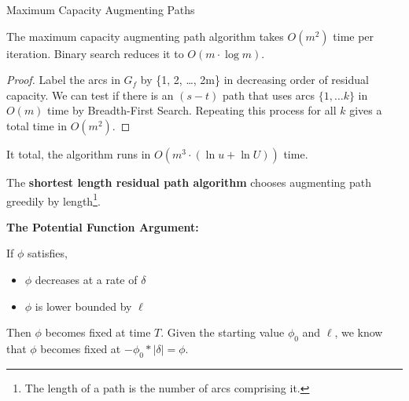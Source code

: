 	\begin{algorithm}
	  \caption{Maximum Capacity Augmenting Paths}\label{greedyaug}
	\end{algorithm}

	\begin{thm}
		The maximum capacity augmenting path algorithm takes $O(m^2)$ time per iteration. Binary search reduces it to $O(m \cdot \log m)$.
	\end{thm}

	\begin{proof}
		Label the arcs in $G_f$ by \{1, 2, \dots, 2m\} in decreasing order of residual capacity. We can test if there is an $(s-t)$ path that uses arcs $\{1, \dots k\}$ in $O(m)$ time by Breadth-First Search. Repeating this process for all $k$ gives a total time in $O(m^2)$.
	\end{proof}

	\begin{cor}
		It total, the algorithm runs in $O(m^3 \cdot (\ln u + \ln U))$ time.
	\end{cor}

	\begin{defn}
		The \textbf{shortest length residual path algorithm} chooses augmenting path greedily by length\footnote{The length of a path is the number of arcs comprising it.}.
	\end{defn}

	\begin{marginfigure}
		\textbf{The Potential Function Argument:}

		If $\phi$ satisfies,
		\begin{itemize}
			\item $\phi$ decreases at a rate of $\delta$
			\item $\phi$ is lower bounded by $\ell$
		\end{itemize}
		\noindent Then $\phi$ becomes fixed at time $T$. Given the starting value $\phi_0$ and $\ell$, we know that $\phi$ becomes fixed at $-\phi_0*|\delta| = \phi$.
	\end{marginfigure}

